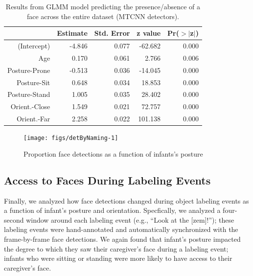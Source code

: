 \documentclass[10pt, letterpaper]{article}
\newenvironment{CodeChunk}{}{}
\begin{document}
\begin{table}[H]
\centering
\begin{tabular}{rrrrr}
  \hline
 & Estimate & Std. Error & z value & Pr($>$$|$z$|$) \\ 
  \hline
(Intercept) & -4.846 & 0.077 & -62.682 & 0.000 \\ 
  Age & 0.170 & 0.061 & 2.766 & 0.006 \\ 
  Posture-Prone & -0.513 & 0.036 & -14.045 & 0.000 \\ 
  Posture-Sit & 0.648 & 0.034 & 18.853 & 0.000 \\ 
  Posture-Stand & 1.005 & 0.035 & 28.402 & 0.000 \\ 
  Orient.-Close & 1.549 & 0.021 & 72.757 & 0.000 \\ 
  Orient.-Far & 2.258 & 0.022 & 101.138 & 0.000 \\ 
   \hline
\end{tabular}
\caption{Results from GLMM model predicting the presence/absence of a face across the entire dataset (MTCNN detectors).} 
\end{table}

\begin{CodeChunk}
\begin{figure}[H]

{\centering \texttt{[image: figs/detByNaming-1]} 

}

\caption[Proportion face detections as a function of infants's posture]{Proportion face detections as a function of infants's posture}\label{fig:detByNaming}
\end{figure}
\end{CodeChunk}

\subsection{Access to Faces During Labeling
Events}\label{access-to-faces-during-labeling-events}

Finally, we analyzed how face detections changed during object labeling
events as a function of infant's posture and orientation. Specfically,
we analyzed a four-second window around each labeling event (e.g.,
``Look at the {[}zem{]}!''); these labeling events were hand-annotated
and automatically synchronized with the frame-by-frame face detections.
We again found that infant's posture impacted the degree to which they
saw their caregiver's face during a labeling event; infants who were
sitting or standing were more likely to have access to their caregiver's
face.
\end{document}

